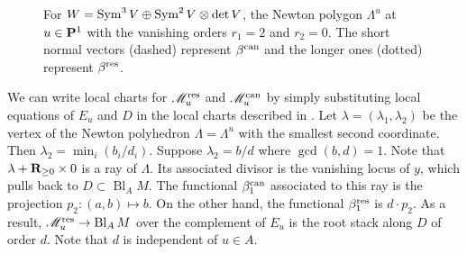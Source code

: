 \documentclass{amsart}
\DeclareMathOperator{\Bl}{Bl}
\begin{document}
\begin{figure}
  \caption{
    For \(W = \Sym^3V \oplus \Sym^2 V \otimes \det V\), the Newton polygon \(\Lambda^u\) at \(u \in \P^1\) with the vanishing orders \(r_1 = 2\) and \(r_2 = 0\).
    The short normal vectors (dashed) represent \(\beta^{\rm can}\) and the longer ones (dotted) represent \(\beta^{\rm res}\).
  }
  \label{fig:blowup}
\end{figure}

We can write local charts for \(\mathscr M^{\rm res}_u\) and \(\mathscr M^{\rm can}_u\) by simply substituting local equations of \(E_u\) and \(D\) in the local charts described in .
Let \(\lambda = (\lambda_1,\lambda_2)\) be the vertex of the Newton polyhedron \(\Lambda = \Lambda^u\) with the smallest second coordinate.
Then \(\lambda_2 = \min_i(b_i/d_i)\).
Suppose \(\lambda_2 = b/d\) where \(\gcd(b,d) = 1\).
Note that \(\lambda + \R_{\geq 0} \times 0\) is a ray of \(\Lambda\).
Its associated divisor is the vanishing locus of \(y\), which pulls back to \(D \subset \Bl_A M\).
The functional \(\beta_1^{\rm can}\) associated to this ray is the projection \(p_2\colon (a,b) \mapsto b\).
On the other hand, the functional \(\beta_1^{\rm res}\) is \(d \cdot p_2\).
As a result, \(\mathscr M^{\rm res}_u \to \Bl_AM\) over the complement of \(E_u\) is the root stack along \(D\) of order \(d\).
Note that \(d\) is independent of \(u \in A\).
\end{document}
